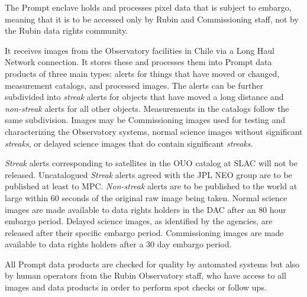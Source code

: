 The Prompt enclave holds and processes pixel data that is subject to embargo, meaning that it is to be accessed only by Rubin and \gls{Commissioning} staff, not by the Rubin data rights community.

It receives images from the Observatory facilities in Chile via a Long Haul Network connection.
It stores these and processes them into Prompt data products of three main types:
alerts for things that have moved or changed, measurement catalogs, and processed images.
The alerts can be further subdivided into \emph{streak} alerts for objects that have moved a long distance and \emph{non-streak} alerts for all other objects.
Measurements in the catalogs follow the same subdivision. Images may be \gls{Commissioning} images used for testing and characterizing the Observatory systems, normal science images without significant \emph{streaks}, or delayed science images that do contain significant \emph{streaks}.

\emph{Streak} alerts corresponding to satellites in the \gls{OUO} catalog at \gls{SLAC} will not be released.
Uncatalogued \emph{Streak} alerts agreed with the \gls{JPL} \gls{NEO} group  are to be published at least to \gls{MPC}.
\emph{Non-streak} alerts are to be published to the world at large within 60 seconds of the original raw image being taken.
Normal science images are made available to data rights holders in the \gls{DAC} after an 80 hour embargo period.
Delayed science images, as identified by the agencies, are released after their specific embargo period. \gls{Commissioning} images are made available to data rights holders after a 30 day embargo period.

All Prompt data products are checked for quality by automated systems but also by human operators from the Rubin Observatory staff, who have access to all images and data products in order to perform spot checks or follow ups.


